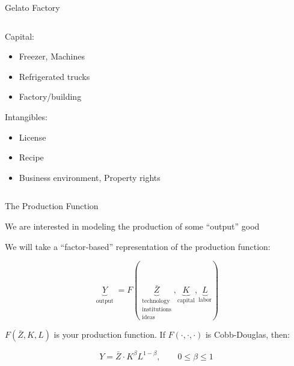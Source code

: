 \documentclass[notes,11pt, aspectratio=169, xcolor=table]{beamer}
\newenvironment{wideitemize}{\itemize\addtolength{\itemsep}{10pt}}{\enditemize}
\begin{document}
\begin{frame}{Gelato Factory}
\begin{columns}[T]
\begin{column}{.6\textwidth}
\begin{wideitemize}
\begin{itemize}
    \end{itemize}
    \item<3-> Capital:
    \begin{itemize}
        \item Freezer, Machines 
        \item Refrigerated trucks
        \item Factory/building
    \end{itemize}
    \item<4-> Intangibles:
    \begin{itemize}
        \item License
        \item Recipe
        \item Business environment, Property rights
    \end{itemize}
    
  \end{wideitemize}
\end{column}%
\end{columns}

\end{frame}


\begin{frame}{The Production Function}

\begin{wideitemize}
\item We are interested in modeling the production of some ``output'' good
\item<2-> We will take a “factor‐based” representation of the production function:

\begin{equation*}
\underbrace{Y}_{\substack{\text{output}}} = F(\underbrace{\bar{Z}}_{\substack{\text{technology}\\\text{institutions}\\\text{ideas}}}, \underbrace{K}_{\text{capital}} , \underbrace{L}_{\text{labor}})
\end{equation*}

\item<3-> $F(\bar{Z}, K, L)$ is your production function. If $F(\cdot, \cdot, \cdot)$ is Cobb-Douglas, then:

\begin{equation*}
    Y = \bar{Z} \cdot K^{\beta} L^{1-\beta}, \qquad 0 \le \beta \le 1  
\end{equation*}

\end{wideitemize}

\end{frame}
\end{document}
